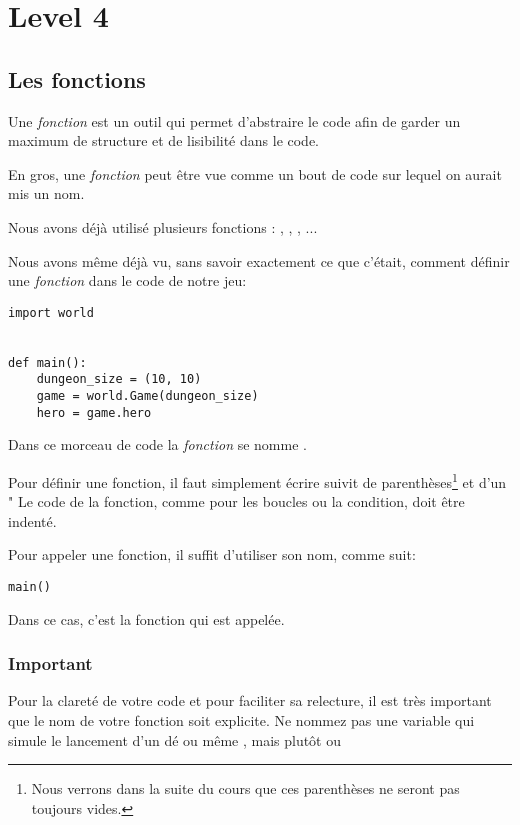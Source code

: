 \chapter{Level 4}

\section{Les fonctions}

Une \emph{fonction} est un outil qui permet d'abstraire le code afin de garder un maximum de structure et de lisibilité dans le code.

En gros, une \emph{fonction} peut être vue comme un bout de code sur lequel on aurait mis un nom.

Nous avons déjà utilisé plusieurs fonctions : , , , ...

Nous avons même déjà vu, sans savoir exactement ce que c'était, comment définir une \emph{fonction} dans le code de notre jeu:


\begin{lstlisting}
import world


def main():
    dungeon_size = (10, 10)
    game = world.Game(dungeon_size)
    hero = game.hero
\end{lstlisting}

Dans ce morceau de code la \emph{fonction} se nomme .

Pour définir une fonction, il faut simplement écrire  suivit de parenthèses\footnote{Nous verrons dans la suite du cours que ces parenthèses ne seront pas toujours vides.} et d'un "\codeintext{:}
Le code de la fonction, comme pour les boucles ou la condition, doit être indenté.

Pour appeler une fonction, il suffit d'utiliser son nom, comme suit:

\begin{lstlisting}
main()
\end{lstlisting}

Dans ce cas, c'est la fonction  qui est appelée.

\subsection{Important}
Pour la clareté de votre code et pour faciliter sa relecture, il est très important que le nom de votre fonction soit explicite.
Ne nommez pas une variable qui simule le lancement d'un dé  ou même , mais plutôt  ou 

